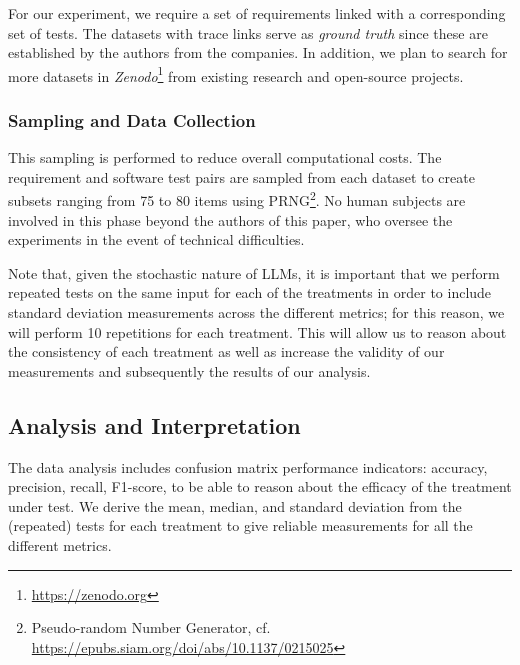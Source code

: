 \documentclass[conference]{IEEEtran}
\begin{document}
For our experiment, we require a set of requirements linked with a corresponding set of tests. The datasets with trace links serve as \textit{ground truth} since these are established by the authors from the companies. In addition, we plan to search for more datasets in \textit{Zenodo}\footnote{\url{https://zenodo.org}} from existing research and open-source projects. 

\subsubsection{Sampling and Data Collection}
This sampling is performed to reduce overall computational costs. The requirement and software test pairs are sampled from each dataset to create subsets ranging from 75 to 80 items using PRNG\footnote{Pseudo-random Number Generator, cf. \url{https://epubs.siam.org/doi/abs/10.1137/0215025}}. No human subjects are involved in this phase beyond the authors of this paper, who oversee the experiments in the event of technical difficulties.

Note that, given the stochastic nature of LLMs, it is important that we perform repeated tests on the same input for each of the treatments in order to include standard deviation measurements across the different metrics; for this reason, we will perform 10 repetitions for each treatment. This will allow us to reason about the consistency of each treatment as well as increase the validity of our measurements and subsequently the results of our analysis.

\subsection{Analysis and Interpretation}


The data analysis includes confusion matrix performance indicators: accuracy, precision, recall, F1-score, to be able to reason about the efficacy of the treatment under test. We derive the mean, median, and standard deviation from the (repeated) tests for each treatment to give reliable measurements for all the different metrics. 
\end{document}
